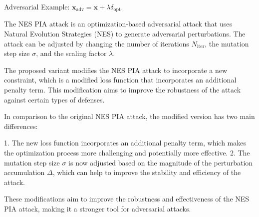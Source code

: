 Adversarial Example: $\mathbf{x}_{\text{adv}} = \mathbf{x} + \lambda \delta_{\text{opt}}$.

The NES PIA attack is an optimization-based adversarial attack that uses Natural Evolution Strategies (NES) to generate adversarial perturbations. The attack can be adjusted by changing the number of iterations $N_{\text{iter}}$, the mutation step size $\sigma$, and the scaling factor $\lambda$. 

The proposed variant modifies the NES PIA attack to incorporate a new constraint, which is a modified loss function that incorporates an additional penalty term. This modification aims to improve the robustness of the attack against certain types of defenses.

In comparison to the original NES PIA attack, the modified version has two main differences:

1.  The new loss function incorporates an additional penalty term, which makes the optimization process more challenging and potentially more effective.
2.  The mutation step size $\sigma$ is now adjusted based on the magnitude of the perturbation accumulation $\Delta$, which can help to improve the stability and efficiency of the attack.

These modifications aim to improve the robustness and effectiveness of the NES PIA attack, making it a stronger tool for adversarial attacks.